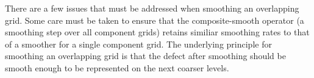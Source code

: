 \documentclass[11pt]{article}
\begin{document}
There are a few issues that must be addressed when smoothing an overlapping grid.
Some care must be taken to ensure that the composite-smooth operator (a smoothing step
over all component grids) retains similiar smoothing rates to that of a smoother for a 
single component grid. The underlying principle for smoothing an overlapping
grid is that the defect after smoothing should be smooth enough to be represented 
on the next coarser levels.








\printindex
\end{document}
